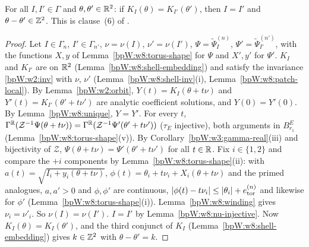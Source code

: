\begin{proposition}\label{bpW:w8:injective}
For all $I,I'\in\Gamma$ and $\theta,\theta'\in\mathbb{R}^2$: if $K_I(\theta)=K_{I'}(\theta')$, then $I=I'$ and $\theta-\theta'\in\mathbb{Z}^2$. This is
clause~(6) of .
\end{proposition}
\begin{proof}
Let $I\in\Gamma_n$, $I'\in\Gamma_{n'}$, $\nu=\nu(I)$, $\nu'=\nu(I')$, $\Psi=\tilde\Psi^{(n)}_I$, $\Psi'=\tilde\Psi^{(n')}_{I'}$, with the functions
$X,y$ of Lemma~\ref{bpW:w8:torus-shape} for $\Psi$ and $X',y'$ for $\Psi'$.
\label{stepW:w8:in-orbit} $K_I$ and $K_{I'}$ are  on $\mathbb{R}^2$ (Lemma~\ref{bpW:w8:shell-embedding}) and satisfy the
invariance \eqref{bpW:w2:inv} with $\nu$, $\nu'$ (Lemma~\ref{bpW:w8:shell-inv}(i), Lemma~\ref{bpW:w8:patch-local}). By Lemma~\ref{bpW:w2:orbit},
$Y(t)=K_I(\theta+t\nu)$ and $Y'(t)=K_{I'}(\theta'+t\nu')$ are analytic coefficient solutions, and $Y(0)=Y'(0)$. By
Lemma~\ref{bpW:w8:unique}, $Y=Y'$.
\label{stepW:w8:in-birk} For every $t$, $\Gamma^{\mathbb{R}}(\mathcal Z^{-1}\Psi(\theta+t\nu))=\Gamma^{\mathbb{R}}(\mathcal Z^{-1}\Psi'(\theta'+t\nu'))$
($\tau_E$ injective), both arguments in $B^E_{r_1}$ (Lemma~\ref{bpW:w8:torus-shape}(v)). By Corollary~\ref{bpW:w3:gamma-real}(iii) and bijectivity of
$\mathcal Z$, $\Psi(\theta+t\nu)=\Psi'(\theta'+t\nu')$ for all $t\in\mathbb{R}$.
\label{stepW:w8:in-freq} Fix $i\in\{1,2\}$ and compare the $+i$ components by Lemma~\ref{bpW:w8:torus-shape}(ii): with
$a(t)=\sqrt{I_i+y_i(\theta+t\nu)}$, $\phi(t)=\theta_i+t\nu_i+X_i(\theta+t\nu)$ and the primed analogues, $a,a'>0$ and $\phi,\phi'$ are continuous,
$\lvert \phi(t)-t\nu_i\rvert\le\lvert \theta_i\rvert+e^{(n)}_{\rm tor}$ and likewise for $\phi'$ (Lemma~\ref{bpW:w8:torus-shape}(i)). Lemma~\ref{bpW:w8:winding} gives
$\nu_i=\nu'_i$. So $\nu(I)=\nu(I')$.
\label{stepW:w8:in-act} $I=I'$ by Lemma~\ref{bpW:w8:nu-injective}.
\label{stepW:w8:in-ang} Now $K_I(\theta)=K_I(\theta')$, and the third conjunct of  $K_I$
(Lemma~\ref{bpW:w8:shell-embedding}) gives $k\in\mathbb{Z}^2$ with $\theta-\theta'=k$.
\end{proof}

